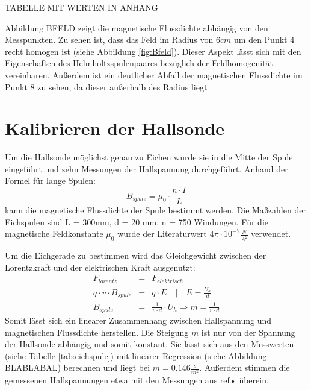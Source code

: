 TABELLE MIT WERTEN IN ANHANG

Abbildung BFELD zeigt die magnetische Flussdichte abhängig von den Messpunkten. Zu sehen ist, dass das Feld im Radius von $6 cm$ um den Punkt 4 recht homogen ist (siehe Abbildung \ref{fig:Bfeld}). Dieser Aspekt lässt sich mit den Eigenschaften des Helmholtzspulenpaares bezüglich der Feldhomogenität vereinbaren. Außerdem ist ein deutlicher Abfall der magnetischen Flussdichte im Punkt 8 zu sehen, da dieser außerhalb des Radius liegt

\section{Kalibrieren der Hallsonde}
Um die Hallsonde möglichst genau zu Eichen wurde sie in die Mitte der Spule eingeführt und zehn Messungen der Hallspannung durchgeführt. Anhand der Formel für lange Spulen:
\begin{equation*}
B_{spule} = \mu_0 \cdot \frac{n \cdot I}{L}
\end{equation*}
kann die magnetische Flussdichte der Spule bestimmt werden. Die Maßzahlen der Eichspulen sind L = 300mm, d = 20 mm, n = 750 Windungen. Für die magnetische Feldkonstante $\mu_0$ wurde der Literaturwert $4\pi \cdot 10^{-7} \frac{N}{A^2}$ verwendet.

Um die Eichgerade zu bestimmen wird das Gleichgewicht zwischen der Lorentzkraft und der elektrischen Kraft ausgenutzt:
\begin{eqnarray*}
F_{lorentz} &=& F_{elektrisch} \\
q \cdot v \cdot B_{spule} &=& q \cdot E \quad | \quad E = \frac{U_h}{d}\\
B_{spule} &=&\frac{1}{v \cdot d} \cdot U_h \Rightarrow m = \frac{1}{v \cdot d}
\end{eqnarray*}
Somit lässt sich ein linearer Zusammenhang zwischen Hallspannung und magnetischen Flussdichte herstellen. Die Steigung $m$ ist nur von der Spannung der Hallsonde abhängig und somit konstant. 
\newline
Sie lässt sich aus den Messwerten (siehe Tabelle \ref{tab:eichspule}) mit linearer Regression (siehe Abbildung BLABLABAL) berechnen und liegt bei $m = 0.146 \frac{s}{m^2}$. Außerdem stimmen die gemessenen Hallspannungen etwa mit den Messungen aus ref{•} überein.

